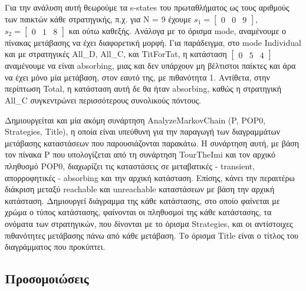 \documentclass[12pt]{article}
\begin{document}
Για την ανάλυση αυτή θεωρούμε τα s-states του πρωταθλήματος ως τους αριθμούς των παικτών κάθε στρατηγικής, π.χ. για N = 9 έχουμε $s_1 = \begin{bmatrix} 0 & 0 & 9 \end{bmatrix}$, $s_2 = \begin{bmatrix} 0 & 1 & 8 \end{bmatrix}$ και ούτω καθεξής. Ανάλογα με το όρισμα mode, αναμένουμε ο πίνακας μετάβασης να έχει διαφορετική μορφή. Για παράδειγμα, στο mode Individual και με στρατηγικές All\_D, All\_C, και TitForTat, η κατάσταση $\begin{bmatrix} 0 & 5 & 4 \end{bmatrix}$ αναμένουμε να είναι absorbing, μιας και δεν υπάρχουν μη βέλτιστοι παίκτες και άρα να έχει μόνο μία μετάβαση, στον εαυτό της, με πιθανότητα 1. Αντίθετα, στην περίπτωση Total, η κατάσταση αυτή δε θα ήταν absorbing, καθώς η στρατηγική All\_C συγκεντρώνει περισσότερους συνολικούς πόντους.

Δημιουργείται και μία ακόμη συνάρτηση AnalyzeMarkovChain\- (P,\- POP0,\- Str\-at\-e\-gies,\- Title), η οποία είναι υπεύθυνη για την παραγωγή των διαγραμμάτων μετάβασης καταστάσεων που παρουσιάζονται παρακάτω. Η συνάρτηση αυτή, με βάση τον πίνακα P που υπολογίζεται από τη συνάρτηση TourTheImi και τον αρχικό πληθυσμό POP0, διαχωρίζει τις καταστάσεις σε μεταβατικές - transient, απορροφητικές - absorbing και την αρχική κατάσταση. Επίσης, κάνει την περαιτέρω διάκριση μεταξύ reachable και unreachable καταστάσεων με βάση την αρχική κατάσταση. Δημιουργεί διάγραμμα της κάθε κατάστασης, στο οποίο φαίνεται με χρώμα ο τύπος κατάστασης, φαίνονται οι πληθυσμοί της κάθε κατάστασης, τα ονόματα των στρατηγικών, που δίνονται με το όρισμα Strategies, και οι αντίστοιχες πιθανότητες μετάβασης πάνω από κάθε μετάβαση. Το όρισμα Title είναι ο τίτλος του διαγράμματος που προκύπτει. 
\subsection{Προσομοιώσεις}
\end{document}
